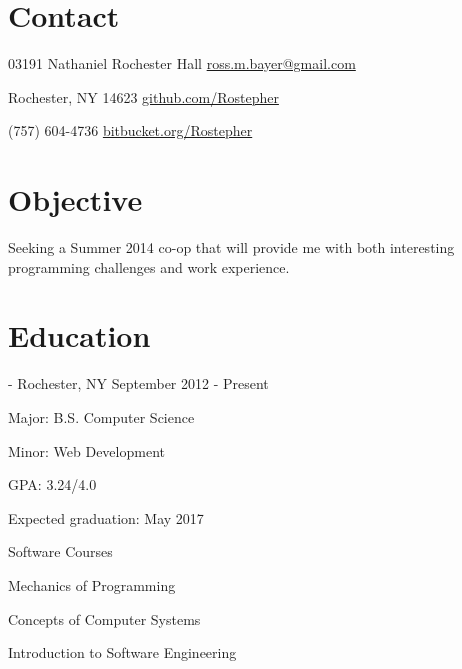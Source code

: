 \documentclass[letterpaper,margin,line,11pt]{resume}
\newcommand{\rdate}[1]{\hfill {\small #1}}
\begin{document}
\begin{resume}

\section{\mysidestyle Contact} 
	\begin{asparablank}
		\item 03191 Nathaniel Rochester Hall \hfill \href{mailto:ross.m.bayer@gmail.com}{ross.m.bayer@gmail.com}
		\item Rochester, NY 14623 \hfill \href{https://github.com/Rostepher}{github.com/Rostepher}
		\item (757) 604-4736 \hfill \href{https://bitbucket.org/Rostepher}{bitbucket.org/Rostepher}
	\end{asparablank}

\section{\mysidestyle Objective}
	Seeking a Summer 2014 co-op that will provide me with both interesting programming challenges and work experience.

\section{\mysidestyle Education}
	\begin{compactdesc}
		\item[Rochester Institute of Technology] - Rochester, NY \rdate{September 2012 - Present}
		\begin{compactitem} {
			\item Major: B.S. Computer Science
			\item Minor: Web Development
			\item GPA: 3.24/4.0
			\item Expected graduation: May 2017
			\item Software Courses
			\begin{compactitem} { \small
			    \item Mechanics of Programming
			    \item Concepts of Computer Systems
			    \item Introduction to Software Engineering
			} \end{compactitem}
		} \end{compactitem}
	\end{compactdesc}


\end{resume}
\end{document}

